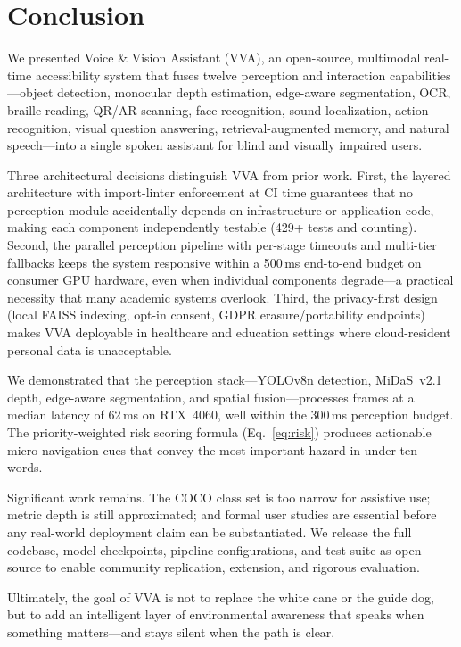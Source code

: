 \section{Conclusion}
\label{sec:conclusion}

We presented Voice \& Vision Assistant (VVA), an open-source, multimodal real-time accessibility system that fuses twelve perception and interaction capabilities---object detection, monocular depth estimation, edge-aware segmentation, OCR, braille reading, QR/AR scanning, face recognition, sound localization, action recognition, visual question answering, retrieval-augmented memory, and natural speech---into a single spoken assistant for blind and visually impaired users.

Three architectural decisions distinguish VVA from prior work. First, the layered architecture with import-linter enforcement at CI time guarantees that no perception module accidentally depends on infrastructure or application code, making each component independently testable (429+ tests and counting). Second, the parallel perception pipeline with per-stage timeouts and multi-tier fallbacks keeps the system responsive within a 500\,ms end-to-end budget on consumer GPU hardware, even when individual components degrade---a practical necessity that many academic systems overlook. Third, the privacy-first design (local FAISS indexing, opt-in consent, GDPR erasure/portability endpoints) makes VVA deployable in healthcare and education settings where cloud-resident personal data is unacceptable.

We demonstrated that the perception stack---YOLOv8n detection, MiDaS~v2.1 depth, edge-aware segmentation, and spatial fusion---processes frames at a median latency of 62\,ms on RTX~4060, well within the 300\,ms perception budget. The priority-weighted risk scoring formula (Eq.~\ref{eq:risk}) produces actionable micro-navigation cues that convey the most important hazard in under ten words.

Significant work remains. The COCO class set is too narrow for assistive use; metric depth is still approximated; and formal user studies are essential before any real-world deployment claim can be substantiated. We release the full codebase, model checkpoints, pipeline configurations, and test suite as open source to enable community replication, extension, and rigorous evaluation.

Ultimately, the goal of VVA is not to replace the white cane or the guide dog, but to add an intelligent layer of environmental awareness that speaks when something matters---and stays silent when the path is clear.
